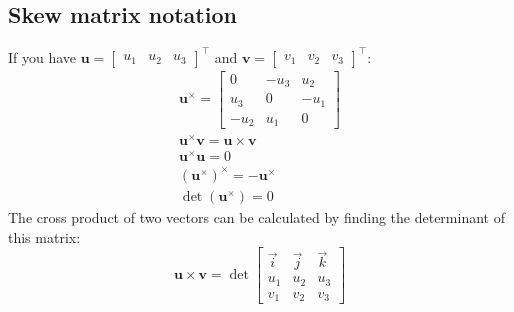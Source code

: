 \subsection{Skew matrix notation}
If you have $\mathbf{u} = \begin{bmatrix}u_1 & u_2 & u_3\end{bmatrix}^\top$ and $\mathbf{v} = \begin{bmatrix}v_1 & v_2 & v_3\end{bmatrix}^\top$:
\begin{subequations}
    \begin{align}
    \mathbf{u}^\times = \begin{bmatrix}
                    0 & -u_3 & u_2 \\
                    u_3 & 0 & -u_1 \\
                    -u_2 & u_1 & 0
                  \end{bmatrix} \\
    \mathbf{u}^\times \mathbf{v} = \mathbf{u} \times \mathbf{v} \\
    \mathbf{u}^\times \mathbf{u} = 0 \\
    \left(\mathbf{u}^\times\right)^\times = -\mathbf{u}^\times \\
    \det{(\mathbf{u}^\times)} = 0  
    \end{align}
\end{subequations}
The cross product of two vectors can be calculated by finding the determinant of this matrix:
\begin{equation}
    \mathbf{u} \times \mathbf{v} = \det{\begin{bmatrix}
                    \vec{i} & \vec{j} & \vec{k} \\
                    u_1 & u_2 & u_3 \\
                    v_1 & v_2 & v_3
                  \end{bmatrix}}
\end{equation}

